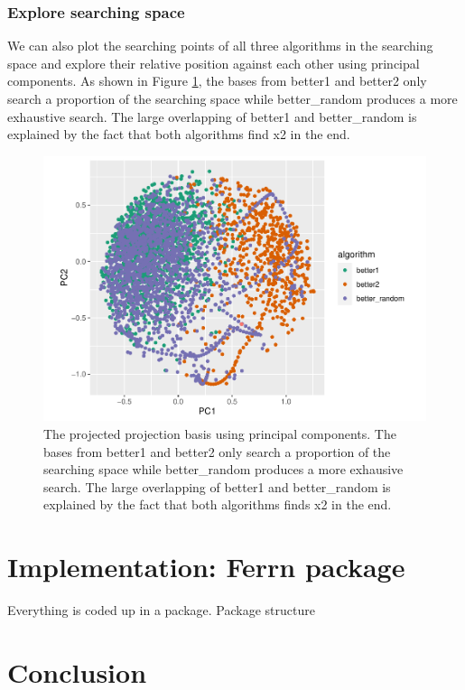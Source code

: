 \documentclass[12pt]{article}
\begin{document}
\hypertarget{explore-searching-space}{%
\subsubsection{Explore searching space}\label{explore-searching-space}}

We can also plot the searching points of all three algorithms in the
searching space and explore their relative position against each other
using principal components. As shown in Figure
\ref{1d-2var-explore-proj-pca}, the bases from better1 and better2 only
search a proportion of the searching space while better\_random produces
a more exhaustive search. The large overlapping of better1 and
better\_random is explained by the fact that both algorithms find x2 in
the end.

\begin{figure}
\centering
\includegraphics{paper_files/figure-latex/1d-2var-explore-proj-pca-1.pdf}
\caption{\label{1d-2var-explore-proj-pca} The projected projection basis
using principal components. The bases from better1 and better2 only
search a proportion of the searching space while better\_random produces
a more exhausive search. The large overlapping of better1 and
better\_random is explained by the fact that both algorithms finds x2 in
the end.}
\end{figure}

\hypertarget{implementation}{%
\section{Implementation: Ferrn package}\label{implementation}}

Everything is coded up in a package. Package structure

\hypertarget{conclusion}{%
\section{Conclusion}\label{conclusion}}

\clearpage



\end{document}
